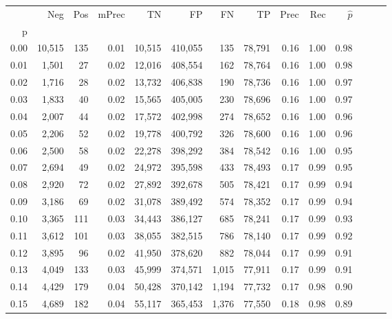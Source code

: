 \begin{tabular}{rrrrrrrrrrrrrr}
\toprule
{} &     Neg &    Pos & mPrec &       TN &       FP &      FN &      TP &  Prec &   Rec & $\hat{p}$ \\
p    &         &        &       &          &          &         &         &       &       &           \\
\midrule
0.00 &  10,515 &    135 &  0.01 &   10,515 &  410,055 &     135 &  78,791 &  0.16 &  1.00 &      0.98 \\
0.01 &   1,501 &     27 &  0.02 &   12,016 &  408,554 &     162 &  78,764 &  0.16 &  1.00 &      0.98 \\
0.02 &   1,716 &     28 &  0.02 &   13,732 &  406,838 &     190 &  78,736 &  0.16 &  1.00 &      0.97 \\
0.03 &   1,833 &     40 &  0.02 &   15,565 &  405,005 &     230 &  78,696 &  0.16 &  1.00 &      0.97 \\
0.04 &   2,007 &     44 &  0.02 &   17,572 &  402,998 &     274 &  78,652 &  0.16 &  1.00 &      0.96 \\
0.05 &   2,206 &     52 &  0.02 &   19,778 &  400,792 &     326 &  78,600 &  0.16 &  1.00 &      0.96 \\
0.06 &   2,500 &     58 &  0.02 &   22,278 &  398,292 &     384 &  78,542 &  0.16 &  1.00 &      0.95 \\
0.07 &   2,694 &     49 &  0.02 &   24,972 &  395,598 &     433 &  78,493 &  0.17 &  0.99 &      0.95 \\
0.08 &   2,920 &     72 &  0.02 &   27,892 &  392,678 &     505 &  78,421 &  0.17 &  0.99 &      0.94 \\
0.09 &   3,186 &     69 &  0.02 &   31,078 &  389,492 &     574 &  78,352 &  0.17 &  0.99 &      0.94 \\
0.10 &   3,365 &    111 &  0.03 &   34,443 &  386,127 &     685 &  78,241 &  0.17 &  0.99 &      0.93 \\
0.11 &   3,612 &    101 &  0.03 &   38,055 &  382,515 &     786 &  78,140 &  0.17 &  0.99 &      0.92 \\
0.12 &   3,895 &     96 &  0.02 &   41,950 &  378,620 &     882 &  78,044 &  0.17 &  0.99 &      0.91 \\
0.13 &   4,049 &    133 &  0.03 &   45,999 &  374,571 &   1,015 &  77,911 &  0.17 &  0.99 &      0.91 \\
0.14 &   4,429 &    179 &  0.04 &   50,428 &  370,142 &   1,194 &  77,732 &  0.17 &  0.98 &      0.90 \\
0.15 &   4,689 &    182 &  0.04 &   55,117 &  365,453 &   1,376 &  77,550 &  0.18 &  0.98 &      0.89 \\

\end{tabular}
